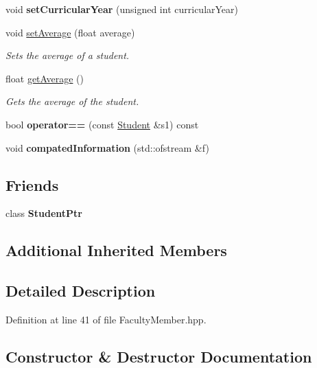 \begin{DoxyCompactItemize}
\mbox{\label{classStudent_ab0452be33ce4d8d991c716302c8a6b2d}} 
void {\bfseries set\+Curricular\+Year} (unsigned int curricular\+Year)
\item 
void \hyperlink{classStudent_a5b0b522fd636bfc266a08129a8784a0a}{set\+Average} (float average)
\begin{DoxyCompactList}\small\item\em Sets the average of a student. \end{DoxyCompactList}\item 
float \hyperlink{classStudent_a0d7d2e908da7c3d4b7d1fd7fb4bccf6c}{get\+Average} ()
\begin{DoxyCompactList}\small\item\em Gets the average of the student. \end{DoxyCompactList}\item 
\mbox{\label{classStudent_aa5477568333bf5c85f5bf6a67d44580e}} 
bool {\bfseries operator==} (const \hyperlink{classStudent}{Student} \&s1) const
\item 
\mbox{\label{classStudent_a28d807df5f7ed8d39c9de19d6266ba82}} 
void {\bfseries compated\+Information} (std\+::ofstream \&f)
\end{DoxyCompactItemize}
\subsection*{Friends}
\begin{DoxyCompactItemize}
\item 
\mbox{\label{classStudent_aba7f21809ffa875b1e9bf8aa756c0ab2}} 
class {\bfseries Student\+Ptr}
\end{DoxyCompactItemize}
\subsection*{Additional Inherited Members}


\subsection{Detailed Description}


Definition at line 41 of file Faculty\+Member.\+hpp.



\subsection{Constructor \& Destructor Documentation}
\mbox{\label{classStudent_a048addf53c9fe5b126ec7656fbe701ad}} 
